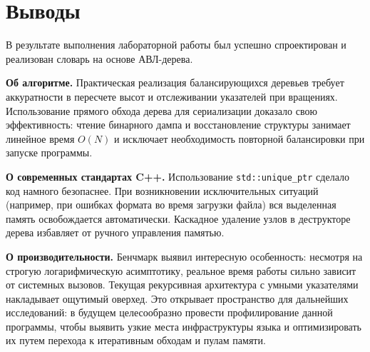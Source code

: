 \section{Выводы}

В результате выполнения лабораторной работы был успешно спроектирован и реализован словарь на основе АВЛ-дерева. 

\textbf{Об алгоритме.} Практическая реализация балансирующихся деревьев требует аккуратности в пересчете высот и отслеживании указателей при вращениях. Использование прямого обхода дерева для сериализации доказало свою эффективность: чтение бинарного дампа и восстановление структуры занимает линейное время $O(N)$ и исключает необходимость повторной балансировки при запуске программы.

\textbf{О современных стандартах C++.} Использование \texttt{std::unique\_ptr} сделало код намного безопаснее. При возникновении исключительных ситуаций (например, при ошибках формата во время загрузки файла) вся выделенная память освобождается автоматически. Каскадное удаление узлов в деструкторе дерева избавляет от ручного управления памятью.

\textbf{О производительности.} Бенчмарк выявил интересную особенность: несмотря на строгую логарифмическую асимптотику, реальное время работы сильно зависит от системных вызовов. Текущая рекурсивная архитектура с умными указателями накладывает ощутимый оверхед. Это открывает пространство для дальнейших исследований: в будущем целесообразно провести профилирование данной программы, чтобы выявить узкие места инфраструктуры языка и оптимизировать их путем перехода к итеративным обходам и пулам памяти.
\pagebreak